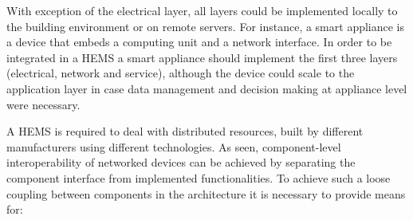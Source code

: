 \documentclass{article}
\begin{document}
With exception of the electrical layer, all layers could be implemented locally to the building environment or on remote servers.
For instance, a smart appliance is a device that embeds a computing unit and a network interface.
In order to be integrated in a \ac{HEMS} a smart appliance should implement the first three layers (electrical, network and service),
although the device could scale to the application layer in case data management and decision making at appliance level were necessary.

A \ac{HEMS} is required to deal with distributed resources, built by different manufacturers using different technologies.
As seen, component-level interoperability of networked devices can be achieved by separating the component interface from implemented functionalities.
To achieve such a loose coupling between components in the architecture it is necessary to provide means for:
\end{document}
